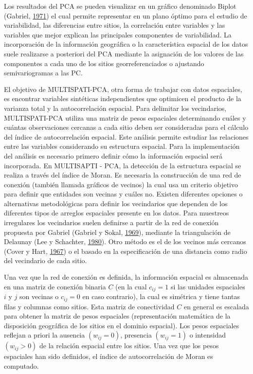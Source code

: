 \documentclass[11pt,b5paper,]{krantz}
\begin{document}
Los resultados del PCA se pueden visualizar en un gráfico denominado Biplot (Gabriel, \protect\hyperlink{ref-Gabriel_1971}{1971}) el cual permite representar en un plano óptimo para el estudio de variabilidad, las diferencias entre sitios, la correlación entre variables y las variables que mejor explican las principales componentes de variabilidad. La incorporación de la información geográfica o la característica espacial de los datos suele realizarse a posteriori del PCA mediante la asignación de los valores de las componentes a cada uno de los sitios georreferenciados o ajustando semivariogramas a las PC.

El objetivo de MULTISPATI-PCA, otra forma de trabajar con datos espaciales, es encontrar variables sintéticas independientes que optimicen el producto de la varianza total y la autocorrelación espacial. Para delimitar los vecindarios, MULTISPATI-PCA utiliza una matriz de pesos espaciales determinando cuáles y cuántas observaciones cercanas a cada sitio deben ser consideradas para el cálculo del índice de autocorrelación espacial. Este análisis permite estudiar las relaciones entre las variables considerando su estructura espacial. Para la implementación del análisis es necesario primero definir cómo la información espacial será incorporada. En MULTISAPTI - PCA, la detección de la estructura espacial se realiza a través del índice de Moran. Es necesaria la construcción de una red de conexión (también llamada gráficos de vecinos) la cual usa un criterio objetivo para definir que entidades son vecinas y cuáles no. Existen diferentes opciones o alternativas metodológicas para definir los vecindarios que dependen de los diferentes tipos de arreglos espaciales presente en los datos. Para muestreos irregulares los vecindarios suelen definirse a partir de la red de conexión propuesta por Gabriel (Gabriel y Sokal, \protect\hyperlink{ref-Gabriel_Sokal_1969}{1969}), mediante la triangulación de Delaunay (Lee y Schachter, \protect\hyperlink{ref-Lee_Schachter_1980}{1980}). Otro método es el de los vecinos más cercanos (Cover y Hart, \protect\hyperlink{ref-Cover_Hart_1967}{1967}) o el basado en la especificación de una distancia como radio del vecindario de cada sitio.

Una vez que la red de conexión es definida, la información espacial es almacenada en una matriz de conexión binaria \(C\) (en la cual \(c_{ij}=1\) si las unidades espaciales \(i\) y \(j\) son vecinas o \(c_{ij}=0\) en caso contrario), la cual es simétrica y tiene tantas filas y columnas como sitios. Esta matriz de conectividad \(C\) en general es escalada para obtener la matriz de pesos espaciales (representación matemática de la disposición geográfica de los sitios en el dominio espacial). Los pesos espaciales reflejan a priori la ausencia \((w_{ij}=0)\), presencia \((w_{ij}=1)\) o intensidad \((w_{ij}>0)\) de la relación espacial entre los sitios. Una vez que los pesos espaciales han sido definidos, el índice de autocorrelación de Moran es computado.
\end{document}
